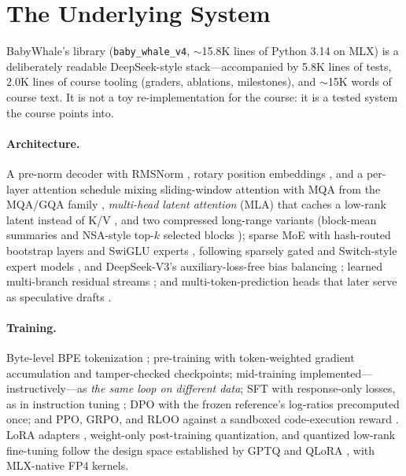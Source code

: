 \section{The Underlying System}
\label{sec:system}

BabyWhale's library (\texttt{baby\_whale\_v4}, $\sim$15.8K lines of Python
3.14 on MLX) is a deliberately readable DeepSeek-style
stack---accompanied by 5.8K lines of tests, 2.0K lines of course tooling
(graders, ablations, milestones), and $\sim$15K words of course text. It is
not a toy re-implementation for the course: it is a tested system the course
points into.

\paragraph{Architecture.} A pre-norm decoder with RMSNorm
\citep{zhang2019root}, rotary position embeddings \citep{su2021roformer}, and a
per-layer attention schedule mixing sliding-window attention
\citep{beltagy2020longformer} with MQA from the MQA/GQA family
\citep{shazeer2019fast,ainslie2023gqa},
\emph{multi-head latent attention} (MLA)
that caches a low-rank latent instead of K/V \citep{deepseekai2024deepseekv2},
and two compressed long-range variants (block-mean summaries and NSA-style
top-$k$ selected blocks \citep{yuan2025nsa}); sparse MoE with hash-routed
bootstrap layers and SwiGLU experts \citep{shazeer2020glu}, following sparsely
gated and Switch-style expert models
\citep{shazeer2017outrageously,fedus2022switch}, and DeepSeek-V3's
auxiliary-loss-free bias balancing \citep{deepseekai2024deepseekv3}; learned
multi-branch residual streams
\citep{zhu2024hyper}; and multi-token-prediction heads that later serve as
speculative drafts \citep{gloeckle2024better,cai2024medusa,leviathan2023fast}.

\paragraph{Training.} Byte-level BPE tokenization \citep{sennrich2016neural};
pre-training with token-weighted gradient accumulation and tamper-checked
checkpoints; mid-training implemented---instructively---as
\emph{the same loop on different data}; SFT with response-only losses, as in
instruction tuning \citep{ouyang2022training}; DPO
\citep{rafailov2023direct} with the frozen reference's log-ratios precomputed
once; and PPO, GRPO, and RLOO
\citep{schulman2017proximal,shao2024deepseekmath,ahmadian2024back} against a
sandboxed code-execution reward \citep{chen2021evaluating}. LoRA adapters
\citep{hu2022lora}, weight-only post-training quantization, and quantized
low-rank fine-tuning follow the design space established by GPTQ and QLoRA
\citep{frantar2022gptq,dettmers2023qlora}, with MLX-native FP4 kernels.

